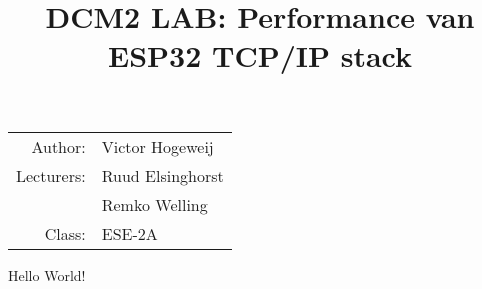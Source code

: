 \documentclass{article}
\title{DCM2 LAB: Performance van ESP32 TCP/IP stack}
\date{\null}
\author{\null}
\begin{document}
  \maketitle
\begin{figure*}[btp]
\begin{tabular}{r@{ }l}
  		  Author:      & Victor Hogeweij \\[1ex] 
		  Lecturers: & Ruud Elsinghorst\\
          			   & Remko Welling\\[1ex]
          Class:		   & ESE-2A

          
\end{tabular}
\end{figure*}
  \newpage
  Hello World!
  
\end{document}
